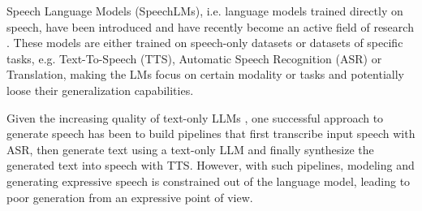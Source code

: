   
  

Speech Language Models (SpeechLMs), i.e. language models trained directly on speech, have been introduced \citep{gslm, algayres2023tgslm, borsos2023audiolm} and have recently become an active field of research 
\citep{Wang2023VallE, nguyen2023dgslm, hassid2023textually, rubenstein2023audiopalm}.
These models are either trained on speech-only datasets or datasets of specific tasks, e.g. Text-To-Speech (TTS), Automatic Speech Recognition (ASR) or Translation, making the LMs focus on certain modality or tasks and potentially loose their generalization capabilities.

\iffalse
Text and speech, despite being different in their expressivity, are both means of conveying language and inherently share their content/meaning. \citealp{hassid2023textually} and \citealp{rubenstein2023audiopalm} utilize Text LLMs to transfer knowledge from text to speech. However, little work has actually analyzed the cross-modal generation capabilities of SpeechLMs. In this work, we address the question of whether the knowledge of TextLMs can be transferred to SpeechLMs, and if the model can generate text and speech in a coherent cross-modal manner.
\fi
Given the increasing quality of text-only LLMs \citep{brown2020gpt3,touvron2023llama2}, one successful approach to generate speech has been to build pipelines that first transcribe input speech with ASR,  then generate text using a text-only LLM and finally synthesize the generated text into speech with TTS. However, with such pipelines, modeling and generating expressive speech is constrained out of the language model, leading to poor generation from an expressive point of view.  

